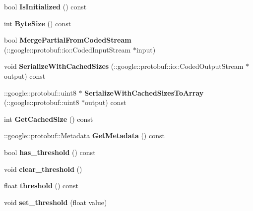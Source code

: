 \begin{DoxyCompactItemize}
bool {\bfseries Is\+Initialized} () const
\item 
\mbox{\label{classcaffe_1_1_threshold_parameter_a9e31afe055afeaf5f65221f80a1813f0}} 
int {\bfseries Byte\+Size} () const
\item 
\mbox{\label{classcaffe_1_1_threshold_parameter_a53c2d9738e305c3792857614877d38d0}} 
bool {\bfseries Merge\+Partial\+From\+Coded\+Stream} (\+::google\+::protobuf\+::io\+::\+Coded\+Input\+Stream $\ast$input)
\item 
\mbox{\label{classcaffe_1_1_threshold_parameter_ab7f0daca4248bf0c2cb23d46d1b78078}} 
void {\bfseries Serialize\+With\+Cached\+Sizes} (\+::google\+::protobuf\+::io\+::\+Coded\+Output\+Stream $\ast$output) const
\item 
\mbox{\label{classcaffe_1_1_threshold_parameter_a14d7ec15dd41b2f98410eb0f7c3367db}} 
\+::google\+::protobuf\+::uint8 $\ast$ {\bfseries Serialize\+With\+Cached\+Sizes\+To\+Array} (\+::google\+::protobuf\+::uint8 $\ast$output) const
\item 
\mbox{\label{classcaffe_1_1_threshold_parameter_ac68b097998911b1426f4018441e3d126}} 
int {\bfseries Get\+Cached\+Size} () const
\item 
\mbox{\label{classcaffe_1_1_threshold_parameter_a1d3370f9d8d8c09ae1889651ec04042d}} 
\+::google\+::protobuf\+::\+Metadata {\bfseries Get\+Metadata} () const
\item 
\mbox{\label{classcaffe_1_1_threshold_parameter_ad63a35c3a90064a79c36eee3d6c989a5}} 
bool {\bfseries has\+\_\+threshold} () const
\item 
\mbox{\label{classcaffe_1_1_threshold_parameter_aa5233c8d1eaf063532fa5eb89a5f9089}} 
void {\bfseries clear\+\_\+threshold} ()
\item 
\mbox{\label{classcaffe_1_1_threshold_parameter_af3378e286763921821acc6fdde65db8e}} 
float {\bfseries threshold} () const
\item 
\mbox{\label{classcaffe_1_1_threshold_parameter_aed8524f524c258017ba3f16f77bdf9f0}} 
void {\bfseries set\+\_\+threshold} (float value)
\end{DoxyCompactItemize}

